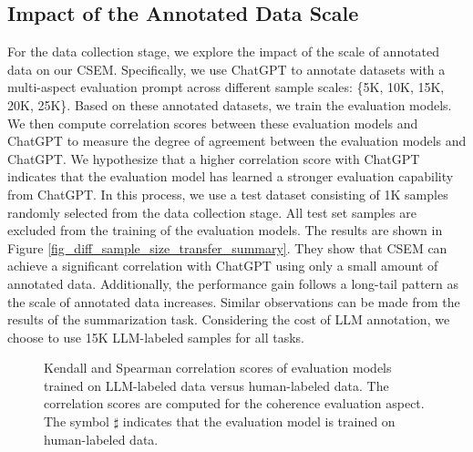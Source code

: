 \documentclass[lettersize,journal]{IEEEtran}
\begin{document}
\subsection{Impact of the Annotated Data Scale}
For the data collection stage, we explore the impact of the scale of annotated data on our CSEM. Specifically, we use ChatGPT to annotate datasets with a multi-aspect evaluation prompt across different sample scales: \{5K, 10K, 15K, 20K, 25K\}. Based on these annotated datasets, we train the evaluation models. We then compute correlation scores between these evaluation models and ChatGPT to measure the degree of agreement between the evaluation models and ChatGPT. We hypothesize that a higher correlation score with ChatGPT indicates that the evaluation model has learned a stronger evaluation capability from ChatGPT. In this process, we use a test dataset consisting of 1K samples randomly selected from the data collection stage. All test set samples are excluded from the training of the evaluation models. The results are shown in Figure \ref{fig_diff_sample_size_transfer_summary}. They show that CSEM can achieve a significant correlation with ChatGPT using only a small amount of annotated data. Additionally, the performance gain follows a long-tail pattern as the scale of annotated data increases. Similar observations can be made from the results of the summarization task. Considering the cost of LLM annotation, we choose to use 15K LLM-labeled samples for all tasks.

\begin{figure}
    \centering
    
    \caption{Kendall and Spearman correlation scores of evaluation models trained on LLM-labeled data versus human-labeled data. The correlation scores are computed for the coherence evaluation aspect. The symbol $\sharp$ indicates that the evaluation model is trained on human-labeled data.}
    \vspace{-3mm}
    \label{fig:llm-vs-human}
\end{figure}
\end{document}
